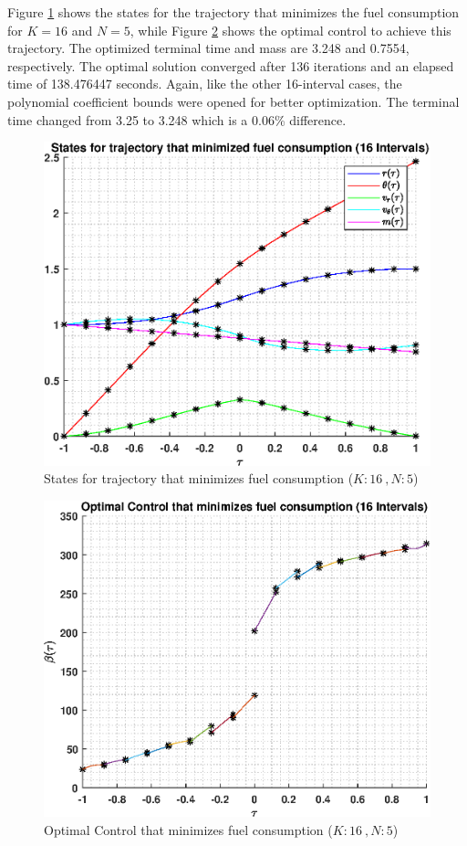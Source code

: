 \documentclass[]{article}
\begin{document}
\vspace{2mm}\newline 
Figure \ref{fig:directStatesK16Poly5} shows the states for the trajectory that minimizes the fuel consumption for \(K = 16\) and  \(N = 5\), while Figure \ref{fig:directControlK16Poly5} shows the optimal control to achieve this trajectory. The optimized terminal time and mass are 3.248 and 0.7554, respectively. The optimal solution converged after 136 iterations and an elapsed time of 138.476447 seconds. Again, like the other 16-interval cases, the polynomial coefficient bounds were opened for better optimization. The terminal time changed from 3.25 to 3.248 which is a 0.06\% difference. 
\begin{figure}
	\centering
	\includegraphics[scale=0.75]{directStatesK16Poly5.eps}
	\caption{States for trajectory that minimizes fuel consumption (\(K:16\ , N:5\))}
	\label{fig:directStatesK16Poly5}
\end{figure}
\begin{figure}
	\centering
	\includegraphics[scale=0.75]{directControlK16Poly5.eps}
	\caption{Optimal Control that minimizes fuel consumption (\(K:16\ , N:5\))}
	\label{fig:directControlK16Poly5}
\end{figure}
\end{document}
